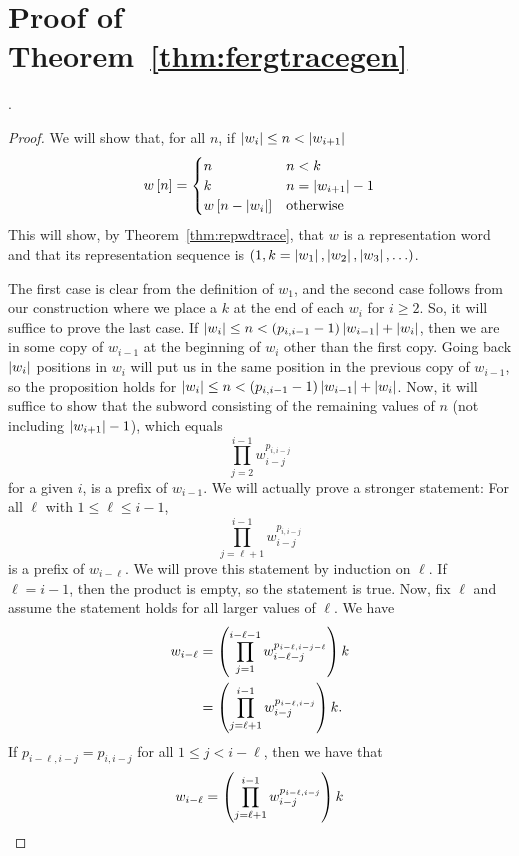 \documentclass[english,12pt]{article}
\newcommand{\seq}{\p}
\begin{document}
\section{Proof of Theorem~\ref{thm:fergtracegen}}\label{app:fergtracegen}.
\begin{proof}
We will show that, for all $n$, if $\left|w_i\right|\leq n<\left|w_{i+1}\right|$
\[
w\left[n\right]=\begin{cases}
n & n<k\\
k & n=\left|w_{i+1}\right|-1\\
w\left[n-\left|w_i\right|\right] & \text{otherwise}
\end{cases}
\]
This will show, by Theorem~\ref{thm:repwdtrace}, that $w$ is a representation word and that its representation sequence is $\seq{1,k=\ab{w_1},\ab{w_2},\ab{w_3},\ldots}$.

The first case is clear from the definition of $w_1$, and the second case follows from our construction where we place a $k$ at the end of each $w_i$ for $i\geq2$.  So, it will suffice to prove the last case.  If $\left|w_i\right|\leq n<\left(p_{i,i-1}-1\right)\left|w_{i-1}\right|+\left|w_i\right|$, then we are in some copy of $w_{i-1}$ at the beginning of $w_i$ other than the first copy.  Going back $\left|w_i\right|$ positions in $w_i$ will put us in the same position in the previous copy of $w_{i-1}$, so the proposition holds for $\left|w_i\right|\leq n<\left(p_{i,i-1}-1\right)\left|w_{i-1}\right|+\left|w_i\right|$.
Now, it will suffice to show that the subword consisting of the remaining values of $n$ (not including $\left|w_{i+1}\right|-1$), which equals
\[
\prod_{j=2}^{i-1}w_{i-j}^{p_{i,i-j}}
\]
for a given $i$, is a prefix of $w_{i-1}$.
We will actually prove a stronger statement: For all $\ell$ with $1\leq\ell\leq i-1$,
\[
\prod_{j=\ell+1}^{i-1}w_{i-j}^{p_{i,i-j}}
\]
is a prefix of $w_{i-\ell}$.  We will prove this statement by induction on $\ell$.  If $\ell=i-1$, then the product is empty, so the statement is true.  Now, fix $\ell$ and assume the statement holds for all larger values of $\ell$.  We have
\begin{align*}
w_{i-\ell}&=\left(\prod_{j=1}^{i-\ell-1}w_{i-\ell-j}^{p_{i-\ell, i-j-\ell}}\right)k\\
&=\left(\prod_{j=\ell+1}^{i-1}w_{i-j}^{p_{i-\ell, i-j}}\right)k.
\end{align*}
If $p_{i-\ell, i-j}=p_{i,i-j}$ for all $1\leq j<i-\ell$, then we have that
\begin{align*}
w_{i-\ell}&=\p{\prod_{j=\ell+1}^{i-1}w_{i-j}^{p_{i-\ell, i-j}}}k\\

\end{align*}
\end{proof}
\end{document}
